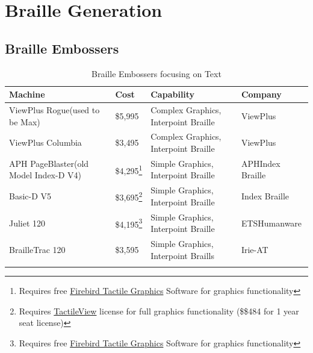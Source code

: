 \documentclass[14pt, letterpaper,twoside]{extreport}
\begin{document}
\pagebreak \hypertarget{generation}{%
\chapter*{Braille Generation}\label{generation}}

\pagebreak \hypertarget{embossers}{%
\section*{Braille Embossers}\label{embossers}}

\begin{longtable}[]{@{}
 >{\raggedright\arraybackslash}p{}
 >{\raggedright\arraybackslash}p{}
 >{\raggedright\arraybackslash}p{}
 >{\raggedright\arraybackslash}p{}@{}
 }
\toprule\noalign{}

\textbf{Machine}
&
\textbf{Cost}
&
\textbf{Capability}
&
\textbf{Company}
\\
\midrule\noalign{}
\endhead
\bottomrule\noalign{}
\endlastfoot
ViewPlus Rogue\break (used to be Max) & \$5,995 & Complex Graphics, Interpoint Braille & ViewPlus \\[1.0em]
ViewPlus Columbia & \$3,495 & Complex Graphics, Interpoint Braille & ViewPlus \\[1.0em]
APH PageBlaster\break (old Model Index-D V4) & \$4,295\footnote{Requires free \href{https://www.aph.org/app/uploads/2020/07/Firebird_signed_V31.zip}{Firebird Tactile Graphics} Software for graphics functionality} & Simple Graphics, Interpoint Braille & APH\break Index Braille \\[1.0em]
Basic-D V5 & \$3,695\footnote{Requires \href{https://tactileview.com/}{TactileView} license for full graphics functionality (\$\$484 for 1 year seat license)} & Simple Graphics, Interpoint Braille & Index Braille \\[1.0em]
Juliet 120 & \$4,195\footnote{Requires free \href{https://www.aph.org/app/uploads/2020/07/Firebird_signed_V31.zip}{Firebird Tactile Graphics} Software for graphics functionality} & Simple Graphics, Interpoint Braille & ETS\break Humanware \\[1.0em]
BrailleTrac 120 & \$3,595 & Simple Graphics, Interpoint Braills & Irie-AT \\[1.0em]\hline
\caption{ Braille Embossers focusing on Text}
\end{longtable}
\end{document}
